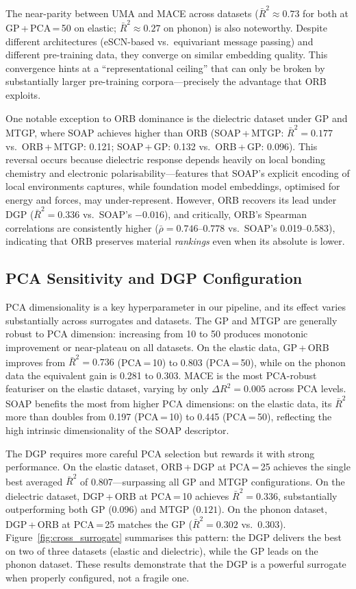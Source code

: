 The near-parity between UMA and MACE across datasets ($\bar{R}^2 \approx 0.73$ for both at GP\,+\,PCA\,=\,50 on elastic; $\bar{R}^2 \approx 0.27$ on phonon) is also noteworthy.
Despite different architectures (eSCN-based vs.\ equivariant message passing) and different pre-training data, they converge on similar embedding quality.
This convergence hints at a ``representational ceiling'' that can only be broken by substantially larger pre-training corpora---precisely the advantage that ORB exploits.

One notable exception to ORB dominance is the dielectric dataset under GP and MTGP, where SOAP achieves higher \Rtwo{} than ORB (SOAP\,+\,MTGP: $\bar{R}^2 = 0.177$ vs.\ ORB\,+\,MTGP: 0.121; SOAP\,+\,GP: 0.132 vs.\ ORB\,+\,GP: 0.096).
This reversal occurs because dielectric response depends heavily on local bonding chemistry and electronic polarisability---features that SOAP's explicit encoding of local environments captures, while foundation model embeddings, optimised for energy and forces, may under-represent.
However, ORB recovers its lead under DGP ($\bar{R}^2 = 0.336$ vs.\ SOAP's $-0.016$), and critically, ORB's Spearman correlations are consistently higher ($\bar{\rho} = 0.746$--$0.778$ vs.\ SOAP's 0.019--0.583), indicating that ORB preserves material \emph{rankings} even when its absolute \Rtwo{} is lower.

\FloatBarrier
\subsection{PCA Sensitivity and DGP Configuration}
\label{sec:pca_sensitivity_discussion}

PCA dimensionality is a key hyperparameter in our pipeline, and its effect varies substantially across surrogates and datasets.
The GP and MTGP are generally robust to PCA dimension: increasing from 10 to 50 produces monotonic improvement or near-plateau on all datasets.
On the elastic data, GP\,+\,ORB improves from $\bar{R}^2 = 0.736$ (PCA\,=\,10) to 0.803 (PCA\,=\,50), while on the phonon data the equivalent gain is 0.281 to 0.303.
MACE is the most PCA-robust featuriser on the elastic dataset, varying by only $\Delta R^2 = 0.005$ across PCA levels.
SOAP benefits the most from higher PCA dimensions: on the elastic data, its $\bar{R}^2$ more than doubles from 0.197 (PCA\,=\,10) to 0.445 (PCA\,=\,50), reflecting the high intrinsic dimensionality of the SOAP descriptor.

The DGP requires more careful PCA selection but rewards it with strong performance.
On the elastic dataset, ORB\,+\,DGP at PCA\,=\,25 achieves the single best averaged $\bar{R}^2$ of 0.807---surpassing all GP and MTGP configurations.
On the dielectric dataset, DGP\,+\,ORB at PCA\,=\,10 achieves $\bar{R}^2 = 0.336$, substantially outperforming both GP ($0.096$) and MTGP ($0.121$).
On the phonon dataset, DGP\,+\,ORB at PCA\,=\,25 matches the GP ($\bar{R}^2 = 0.302$ vs.\ $0.303$).
Figure~\ref{fig:cross_surrogate} summarises this pattern: the DGP delivers the best \Rtwo{} on two of three datasets (elastic and dielectric), while the GP leads on the phonon dataset.
These results demonstrate that the DGP is a powerful surrogate when properly configured, not a fragile one.

